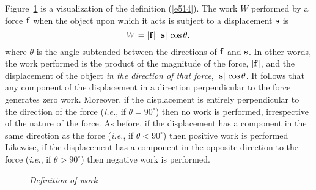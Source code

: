 Figure~\ref{f36} is a visualization of the definition (\ref{e514}). The work $W$
performed by a force ${\bf f}$ when the object upon which it acts is subject to a displacement
${\bf s}$ is
\begin{equation}
W = |{\bf f}|\,\,|{\bf s}|\,\cos\theta.\,
\end{equation}
where $\theta$ is the angle subtended between the directions of ${\bf f}$ and ${\bf s}$. 
In other words, the work performed is the product of the magnitude of the force, $|{\bf f}|$,
and the displacement of the object {\em in the direction of that force}, $|{\bf s}|\,\cos\theta$.
It follows that any component of the displacement in a direction perpendicular to the force
generates zero work. Moreover, if the displacement is entirely perpendicular to the direction
of the force ({\em i.e.}, if $\theta=90^\circ$) then no work is performed, irrespective of
the nature of the force. As before, if the displacement has a  component in the same direction
as the force ({\em i.e.}, if $\theta<90^\circ$) then  positive work is performed
Likewise, if the 
displacement has a  component in the opposite direction
to the force ({\em i.e.}, if $\theta>90^\circ$) then negative work is performed.

\begin{figure}
\epsfysize=2in
\centerline{}
\caption{\em Definition of work}\label{f36}   
\end{figure}

